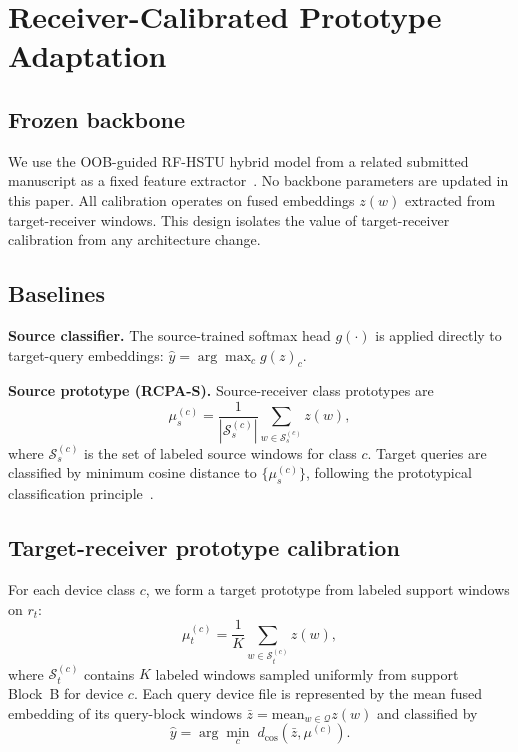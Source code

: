 \section{Receiver-Calibrated Prototype Adaptation}
\label{sec:rcpa}

\subsection{Frozen backbone}
We use the OOB-guided RF-HSTU hybrid model from a related submitted manuscript as a fixed feature extractor~\cite{paper1_placeholder}.
No backbone parameters are updated in this paper.
All calibration operates on fused embeddings $z(w)$ extracted from target-receiver windows.
This design isolates the value of target-receiver calibration from any architecture change.

\subsection{Baselines}
\textbf{Source classifier.}
The source-trained softmax head $g(\cdot)$ is applied directly to target-query embeddings:
$\hat{y}=\arg\max_c g(z)_c$.

\textbf{Source prototype (RCPA-S).}
Source-receiver class prototypes are
\begin{equation}
\mu_s^{(c)}=\frac{1}{|\mathcal{S}_s^{(c)}|}\sum_{w\in\mathcal{S}_s^{(c)}} z(w),
\end{equation}
where $\mathcal{S}_s^{(c)}$ is the set of labeled source windows for class $c$.
Target queries are classified by minimum cosine distance to $\{\mu_s^{(c)}\}$, following the prototypical classification principle~\cite{snell2017prototypical}.

\subsection{Target-receiver prototype calibration}
For each device class $c$, we form a target prototype from labeled support windows on $r_t$:
\begin{equation}
\mu_t^{(c)}=\frac{1}{K}\sum_{w\in\mathcal{S}_t^{(c)}} z(w),
\end{equation}
where $\mathcal{S}_t^{(c)}$ contains $K$ labeled windows sampled uniformly from support Block~B for device $c$.
Each query device file is represented by the mean fused embedding of its query-block windows $\bar{z}=\mathrm{mean}_{w\in\mathcal{Q}} z(w)$ and classified by
\begin{equation}
\hat{y}=\arg\min_c \; d_{\cos}(\bar{z},\mu^{(c)}).
\end{equation}


